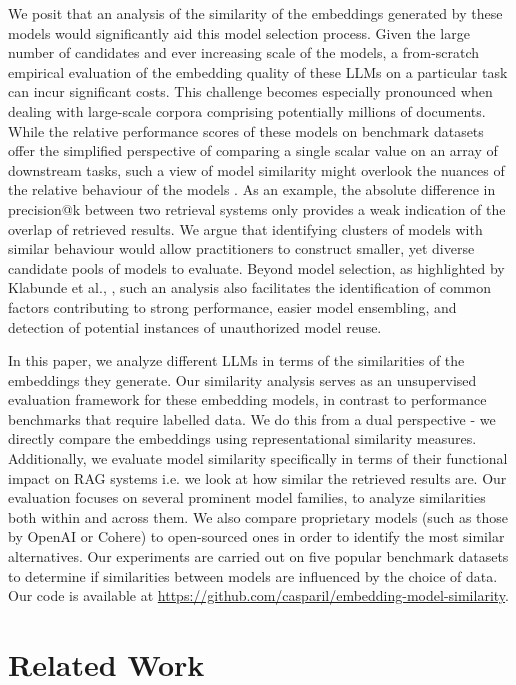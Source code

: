 \documentclass[nonacm,sigconf]{acmart}
\begin{document}
We posit that an analysis of the similarity of the embeddings generated by these models would significantly aid this model selection process. Given the large number of candidates and ever increasing scale of the models, a from-scratch empirical evaluation of the embedding quality of these LLMs on a particular task can incur significant costs. This challenge becomes especially pronounced when dealing with large-scale corpora comprising potentially millions of documents. While the relative performance scores of these models on benchmark datasets offer the simplified perspective of comparing a single scalar value on an array of downstream tasks, such a view of model similarity might overlook the nuances of the relative behaviour of the models \cite{similarity}. As an example, the absolute difference in precision@k between two retrieval systems only provides a  weak indication of the overlap of retrieved results. We argue that identifying clusters of models with similar behaviour would allow practitioners to construct smaller, yet diverse candidate pools of models to evaluate. Beyond model selection, as highlighted by Klabunde et al., \cite{similarity_llm}, such an analysis also facilitates  the identification of common factors contributing to strong performance, easier model ensembling, and detection of potential instances of unauthorized model reuse.

In this paper, we analyze different LLMs in terms of the similarities of the embeddings they generate. Our similarity analysis serves as an unsupervised evaluation framework for these embedding models, in contrast to performance benchmarks that require labelled data. We do this from a dual perspective - we directly compare the embeddings using representational similarity measures. Additionally, we evaluate model similarity specifically in terms of their functional impact on RAG systems i.e. we look at how similar the retrieved results are.
Our evaluation focuses on several prominent model families, to analyze similarities both within and across them. We also compare proprietary models (such as those by OpenAI or Cohere) to open-sourced ones in order to identify the most similar alternatives. Our experiments are carried out on five popular benchmark datasets to determine if similarities between models are influenced by the choice of data. Our code is available at \url{https://github.com/casparil/embedding-model-similarity}.

 



\section{Related Work}
\end{document}
